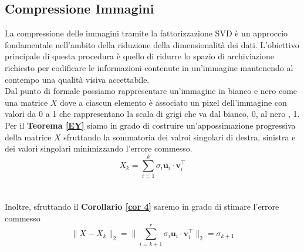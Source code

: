 \documentclass[11pt]{article}
\begin{document}
\subsection{Compressione Immagini}
La compressione delle immagini tramite la fattorizzazione SVD è un approccio fondamentale nell'ambito della riduzione della dimensionalità dei dati. L'obiettivo principale di questa procedura è quello di ridurre lo spazio di archiviazione richiesto per codificare le informazioni contenute in un'immagine mantenendo al contempo una qualità visiva accettabile.\\
Dal punto di formale possiamo rappresentare un'immagine in bianco e nero come una matrice $X$ dove a ciascun elemento è associato un pixel dell'immagine con valori da 0 a 1 che rappresentano la scala di grigi che va dal bianco, 0, al nero , 1. \\
Per il \textbf{Teorema \ref{EY}} siamo in grado di costruire un'appossimazione progressiva della matrice $X$ sfruttando la sommatoria dei valroi singolari di destra, sinistra e dei valori singolari minimizzando l'errore commesso. 
$$ X_k= \sum_{i=1}^{k} \sigma_i \mathbf{u}_i \cdot \mathbf{v}_i^\top $$\\
\\
Inoltre, sfruttando il \textbf{Corollario \ref{cor 4}} saremo in grado di stimare l'errore commesso
$$\|X-X_k\|_2 = \| \sum_{i=k+1}^{r} \sigma_i \mathbf{u}_i \cdot \mathbf{v}_i^\top\|_2=\sigma_{k+1} $$
\end{document}
